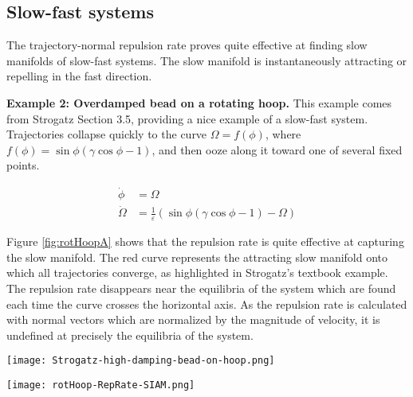 \documentclass[onecolumn,3p]{elsarticle}
\begin{document}
	\subsection{Slow-fast systems}
	The trajectory-normal repulsion rate proves quite effective at finding slow manifolds of slow-fast systems. The slow manifold is instantaneously attracting or repelling in the fast direction. 
	
	\noindent \textbf{Example 2: Overdamped bead on a rotating hoop.} This example comes from Strogatz \cite{strogatz_nonlinear_2014} Section 3.5, providing a nice example of a slow-fast system. Trajectories collapse quickly to the curve $\Omega = f(\phi)$, where $f(\phi) = \sin\phi (\gamma \cos\phi - 1)$, and then ooze along it toward one of several fixed points.
	
	\begin{equation}
	\begin{aligned}
	\dot{\phi} & = \Omega \\
	\dot{\Omega } & = \frac{1}{\varepsilon}\left(\sin\phi(\gamma\cos\phi - 1) - \Omega\right)
	\end{aligned}
	\label{eq: ex3 rotHoop}
	\end{equation}
	
	Figure \ref{fig:rotHoopA} shows that the repulsion rate is quite effective at capturing the slow manifold. The red curve represents the attracting slow manifold onto which all trajectories converge, as highlighted in Strogatz's textbook example. The repulsion rate disappears near the equilibria of the system which are found each time the curve crosses the horizontal axis. As the repulsion rate is calculated with normal vectors which are normalized by the magnitude of velocity, it is undefined at precisely the equilibria of the system.
	
	\begin{figure*}[t]
		\begin{minipage}{0.45\textwidth}
			\centering
			\texttt{[image: Strogatz-high-damping-bead-on-hoop.png]}
		\end{minipage}	
		\begin{minipage}{0.45\textwidth}
			\centering
			\texttt{[image: rotHoop-RepRate-SIAM.png]}
		\end{minipage}
		\caption{\label{fig:rotHoopA} (Left) Figure 3.5.8 of \cite{strogatz_nonlinear_2014} showing the schematic of the slow manifold in the overdamped bead in a rotating hoop.	
			(Right) Using the trajectory-normal repulsion rate $\dot \rho$ to find the slow manifold for (\ref{eq: ex3 rotHoop}) in Example 2, using $\varepsilon = 0.01$ and $\gamma = 2.3$.}
	\end{figure*}
	
\end{document}
